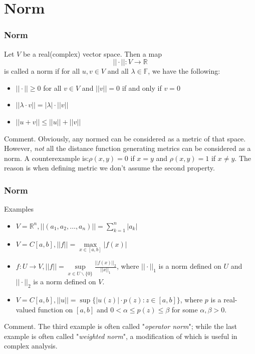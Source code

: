 \documentclass{beamer}
\begin{document}
\section{Norm}
\begin{frame}
    \frametitle{Norm}
    \hspace{1em}
    Let $V$ be a real(complex) vector space. Then a map
    \begin{equation*}
        ||\cdot||:V\rightarrow \mathbb{R}
    \end{equation*}
    is called a norm if for all $u,v\in V$ and all $\lambda\in\mathbb{F}$, we have the following:
    \begin{itemize}
        \item $||\cdot||\geq 0$ for all $v\in V$ and $||v||=0$ if and only if $v=0$
        \item $||\lambda\cdot v||=|\lambda|\cdot ||v||$
        \item $||u+v||\leq ||u||+||v||$
    \end{itemize}
    \vspace{1em}
    Comment.  Obviously, any normed can be considered as a metric of that space. However, \emph{not} all the distance function generating metrics can be
    considered as a norm. A counterexample is:$\rho(x,y)=0$ if $x=y$ and $\rho(x,y)=1$ if $x\neq y$. The reason is when defining metric we don't assume
    the second property.

\end{frame}
\begin{frame}
    \frametitle{Norm}
    Examples\\

    \begin{itemize}
        \item $V=\mathbb{R}^n, ||(a_1,a_2,\dots,a_n)||=\sum^{n}_{k=1}|a_k|$
        \item $V=C[a,b], ||f||=\underset{x\in[a,b]}{\max}|f(x)|$
        \item $f:U\rightarrow V, ||f||=\underset{x\in U\backslash\{0\}}{\sup}\frac{||f(x)||_2}{||x||_1}$, where $||\cdot||_1$ is a norm defined on $U$ and $||\cdot||_2$ is a norm defined on $V$.
        \item $V=C[a,b], ||u||=\sup\{|u(z)|\cdot p(z):z\in[a,b]\}$, where $p$ is a real-valued function on $[a,b]$ and $0<\alpha\leq p(z)\leq \beta $ for some $\alpha,\beta>0$.
    \end{itemize}

    \vspace{1em}
    Comment. The third example is often called "\emph{operator norm}"; while the last example is often called "\emph{weighted norm}", a modification of which is useful in complex analysis.

\end{frame}
\end{document}
